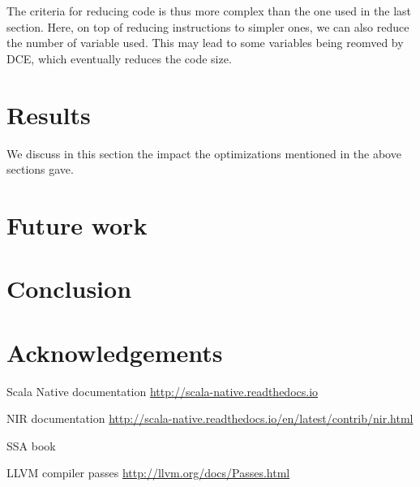 \documentclass[11pt,a4paper]{article}
\begin{document}
The criteria for reducing code is thus more complex than the one used in the last section. Here, on top of reducing instructions to simpler ones, we can also reduce the number of variable used. This may lead to some variables being reomved by DCE, which eventually reduces the code size. 




\section{Results}

We discuss in this section the impact the optimizations mentioned in the above sections gave.


\section{Future work}


\section{Conclusion}


\section*{Acknowledgements}

\begin{thebibliography}{9}

    Scala Native documentation \newline \url{http://scala-native.readthedocs.io}

	 NIR documentation \newline \url{http://scala-native.readthedocs.io/en/latest/contrib/nir.html}
	
	 SSA book
	
	 LLVM compiler passes \newline \url{http://llvm.org/docs/Passes.html}

\end{thebibliography}
\end{document}

